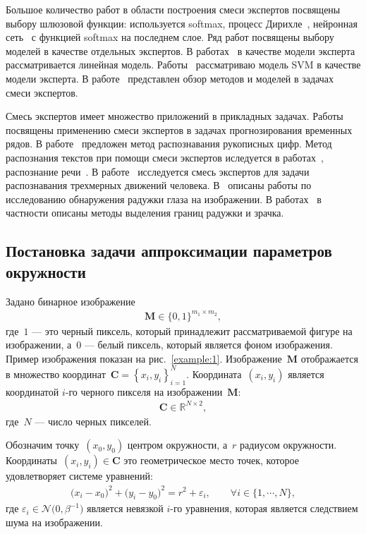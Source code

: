 Большое количество работ в области построения смеси экспертов посвящены выбору шлюзовой функции: используется softmax, процесс Дирихле~\cite{Edward2002}, нейронная сеть~\cite{Shazeer2017} с функцией softmax на последнем слое. Ряд работ посвящены выбору моделей в качестве отдельных экспертов. В работах~\cite{Jordan1994, Jordan1991} в качестве модели эксперта рассматривается линейная модель. Работы~\cite{Lima2007, Cao2003} рассматриваю модель SVM в качестве модели эксперта.
В работе~\cite{Yuksel2012} представлен обзор методов и моделей в задачах смеси экспертов.

Смесь экспертов имеет множество приложений в прикладных задачах. Работы~\cite{Yumlu2003, Cheung1995, Weigend2000} посвящены применению смеси экспертов в задачах прогнозирования временных рядов. 
В работе~\cite{Ebrahimpour2009} предложен метод распознавания рукописных цифр. 
Метод распознания текстов при помощи смеси экспертов иследуется в работах~\cite{Estabrooks2001}, распознание речи~\cite{Mossavat2010, Peng1996, Tuerk2001}. 
В работе~\cite{Sminchisescu2007} исследуется смесь экспертов для задачи распознавания трехмерных движений человека. 
В~\cite{Bowyer2010} описаны работы по исследованию обнаружения радужки глаза на изображении. В работах~\cite{Matveev2010, Matveev2014} в частности описаны методы выделения границ радужки и зрачка.

\subsection{Постановка задачи аппроксимации параметров окружности}
Задано бинарное изображение
\[
\label{eq:st:cr:1}
\begin{aligned}
\textbf{M} \in \{0,1\}^{m_1 \times m_2},
\end{aligned}
\]
где~$1$ --- это черный пиксель, который принадлежит рассматриваемой фигуре на изображении, а~$0$ --- белый пиксель, который является фоном изображения. 
Пример изображения показан на рис.~\ref{example:1}.
Изображение~$\textbf{M}$ отображается в множество координат~\mbox{$\textbf{C}=\left\{x_i, y_i\right\}_{i=1}^{N}$}. Координата~$(x_i, y_i)$ является координатой $i$-го черного пикселя на изображении~$\textbf{M}$:
\[
\label{eq:st:cr:2}
\begin{aligned}
\textbf{C} \in  \mathbb{R}^{N \times 2},
\end{aligned}
\]
где~$N$ --- число черных пикселей.

Обозначим точку~$(x_0, y_0)$ центром окружности, а~$r$ радиусом окружности.
Координаты~$\left(x_i, y_i\right)\in\textbf{C}$ это геометрическое место точек, которое удовлетворяет системе уравнений:
\[
\label{eq:st:cr:3}
\begin{aligned}
\bigr(x_i - x_0\bigr)^{2}+\bigr(y_i-y_0\bigr)^2 = r^2 + \varepsilon_i, \qquad \forall i \in \{1, \cdots, N\},
\end{aligned}
\]
где $\varepsilon_i \in \mathcal{N}\bigr(0, \beta^{-1}\bigr)$ является невязкой $i$-го уравнения, которая является следствием шума на изображении.

